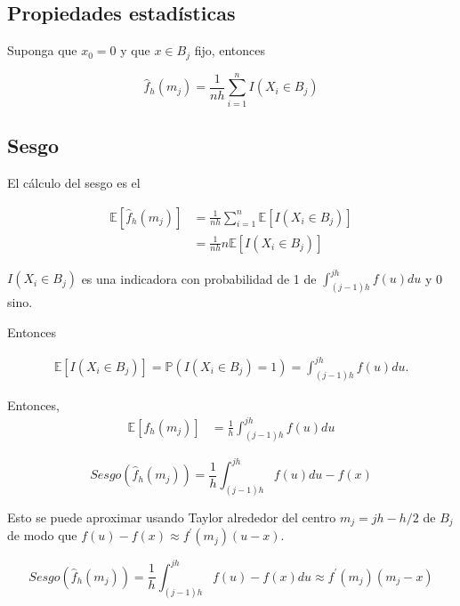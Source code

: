 \documentclass[
  12pt,
]{book}
\theoremstyle{definition}
\theoremstyle{definition}
\theoremstyle{definition}
\theoremstyle{remark}
\begin{document}
\hypertarget{propiedades-estaduxedsticas}{%
\subsection{Propiedades estadísticas}\label{propiedades-estaduxedsticas}}

Suponga que \(x_0 = 0\) y que \(x \in B_j\) fijo, entonces

\begin{equation*}
\hat{f}_h(m_j) =  \frac{1}{nh} \sum_{i = 1}^{n} I(X_i \in B_j)
\end{equation*}

\hypertarget{sesgo}{%
\subsection{Sesgo}\label{sesgo}}

El cálculo del sesgo es el

\begin{align*}
\mathbb{E}\left[ \hat{f}_h(m_j)\right]
& =  \frac{1}{nh} \sum_{i = 1}^{n} \mathbb{E}\left[ I(X_i \in B_j)\right] \\
& = \frac{1}{nh} n \mathbb{E}\left[ I(X_i \in B_j)\right]
\end{align*}

\(I(X_i \in B_j)\) es una indicadora con probabilidad de 1 de \(\int_{(j - 1)h}^{jh} f(u)du\) y 0 sino.

Entonces

\begin{align*}
\mathbb{E}\left[ I(X_i \in B_j)\right] = \mathbb{P}\left(I(X_i \in
B_j)=1\right) = \int_{(j - 1)h}^{jh} f(u)du.
\end{align*}

Entonces,
\begin{align*}
\mathbb{E}\left[{f}_h(m_j)\right]
& = \frac{1}{h} \int_{(j - 1)h}^{jh} f(u)du
\end{align*}

\begin{equation*}
Sesgo(\hat{f}_h(m_j)) = \frac{1}{h} \int_{(j -
1)h}^{jh} f(u)du - f(x)
\end{equation*}

Esto se puede aproximar usando Taylor alrededor del centro \(m_j = jh - h/2\) de \(B_j\) de modo que \(f(u) - f(x) \approx f^{\prime}(m_j)(u - x)\).

\begin{equation*}
Sesgo(\hat{f}_h(m_j)) =  \frac{1}{h} \int_{(j -
1)h}^{jh} f(u) - f(x) du \approx f^\prime(m_j)(m_j - x)
\end{equation*}
\end{document}
